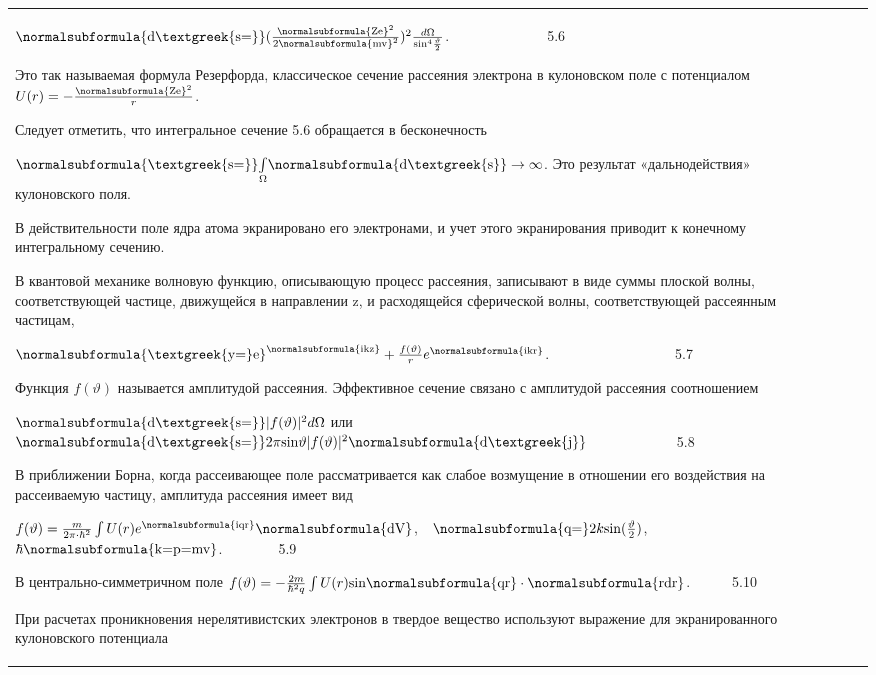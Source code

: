 \documentclass[a4paper,14pt, openany, twoside, draft]{extbook} %
\begin{document}
\begin{flushleft}
\begin{supertabular}{|m{1.7279999cm}|m{1.522cm}|m{1.522cm}|m{1.522cm}|m{1.744cm}|}
  $\normalsubformula{\text{d\textgreek{s=}}}(\frac{\normalsubformula{\text{Ze}}^2}{2\normalsubformula{\text{mv}}^2})^2\frac{d\Omega }{\text{sin}^4\frac{\vartheta } 2}$.\ \ \ \ \ \ \ \ \ \ \ \ \ \ 5.6

Это так называемая формула Резерфорда, классическое сечение рассеяния электрона в кулоновском поле с потенциалом \ \  $U(r)=-\frac{\normalsubformula{\text{Ze}}^2} r$.

Следует отметить, что интегральное сечение 5.6 обращается в бесконечность

 $\normalsubformula{\text{\textgreek{s=}}}\underset{\Omega }{\int }\normalsubformula{\text{d\textgreek{s}}}\rightarrow \infty $. Это результат «дальнодействия» кулоновского поля.

В действительности поле ядра атома экранировано его электронами, и учет этого экранирования приводит к конечному интегральному сечению.

В квантовой механике волновую функцию, описывающую процесс рассеяния, записывают в виде суммы плоской волны, соответствующей частице, движущейся в направлении z, и расходящейся сферической волны, соответствующей рассеянным частицам,

 $\normalsubformula{\text{\textgreek{y=}e}}^{\normalsubformula{\text{ikz}}}+\frac{f(\vartheta )} re^{\normalsubformula{\text{ikr}}}$.\ \ \ \ \ \ \ \ \ \ \ \ \ \ \ \ \ \ 5.7

Функция  $f(\vartheta )$ называется амплитудой рассеяния. Эффективное сечение связано с амплитудой рассеяния соотношением

 $\normalsubformula{\text{d\textgreek{s=}}}|f(\vartheta )|^2d\Omega $ или  $\normalsubformula{\text{d\textgreek{s=}}}2\pi \text{sin}\vartheta |f(\vartheta )|^2\normalsubformula{\text{d\textgreek{j}}}$ \ \ \ \ \ \ \ \ \ \ \ \ 5.8

В приближении Борна, когда рассеивающее поле рассматривается как слабое возмущение в отношении его воздействия на рассеиваемую частицу, амплитуда рассеяния имеет вид

 $f(\vartheta )=\frac m{2\pi \cdot \hbar ^2}\int U(r)e^{\normalsubformula{\text{iqr}}}\normalsubformula{\text{dV}}$,\ \  $\normalsubformula{\text{q=}}2k\text{sin}(\frac{\vartheta } 2)$,\ \ \ \  $\hbar \normalsubformula{\text{k=p=mv}}$.\ \ \ \ \ \ \ \ 5.9

В центрально-симметричном поле  $f(\vartheta )=-\frac{2m}{\hbar ^2q}\int U(r)\text{sin}\normalsubformula{\text{qr}}\cdot \normalsubformula{\text{rdr}}$.\ \ \ \ \ \ 5.10

При расчетах проникновения нерелятивистских электронов в твердое вещество используют выражение для экранированного кулоновского потенциала


\end{supertabular}
\end{flushleft}
\end{document}
